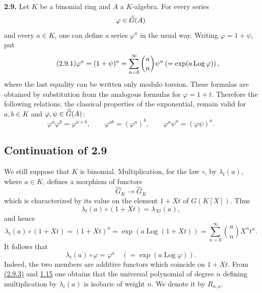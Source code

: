 \textbf{2.9.} Let \(K\) be a binomial ring and \(A\) a \(K\)-algebra. For every series
\[
  \varphi\in\Ghat(A)
\]
and every \(a\in K\), one can define a series \(\varphi^a\) in the usual way. Writing \(\varphi=1+\psi\), put
\begin{equation}\tag{2.9.1}
  \varphi^a=(1+\psi)^a
  =
  \sum_{n=0}^{\infty}\binom{a}{n}\psi^n
  \left(=\exp(a\Log\varphi)\right),
\end{equation}
where the last equality can be written only modulo torsion. These formulas are obtained by substitution from the analogous formulas for \(\varphi=1+t\). Therefore the following relations, the classical properties of the exponential, remain valid for \(a,b\in K\) and \(\varphi,\psi\in\Ghat(A)\):
\begin{equation}\tag{2.9.2}
  \varphi^a\varphi^b=\varphi^{a+b},\qquad
  \varphi^{ab}=(\varphi^a)^b,\qquad
  \varphi^a\psi^a=(\varphi\psi)^a .
\end{equation}



\providecommand{\Ghat}{\widehat G}
\providecommand{\Gg}{\widehat G_g}
\providecommand{\Gcirc}{\widehat G_{\circ}}
\providecommand{\Gnabla}{\widehat G_{\nabla}}
\providecommand{\Grhat}{\widehat{\operatorname{Gr}}}
\providecommand{\Log}{\operatorname{Log}}
\providecommand{\Fil}{\operatorname{Fil}}
\providecommand{\eps}{\varepsilon}
\providecommand{\id}{\operatorname{id}}
\providecommand{\Sym}{\operatorname{Sym}}
\providecommand{\Mon}{\operatorname{Mon}}


\subsection*{Continuation of 2.9}

We still suppose that \(K\) is binomial. Multiplication, for the law \(\circ\), by \(\lambda_t(a)\), where \(a\in K\), defines a morphism of functors
\[
  \Ghat_K\longrightarrow \Ghat_K
\]
which is characterized by its value on the element \(1+Xt\) of \(G(K[X])\). Thus
\[
  \lambda_t(a)\circ(1+Xt)=\lambda_{Xt}(a),
\]
and hence
\begin{equation}\tag{2.9.3}
  \lambda_t(a)\circ(1+Xt)
  =(1+Xt)^a
  =\exp(a\Log(1+Xt))
  =\sum_{n=0}^{\infty}\binom{a}{n}X^nt^n .
\end{equation}
It follows that
\begin{equation}\tag{2.9.4}
  \lambda_t(a)\circ\varphi=\varphi^a
  \quad(=\exp(a\Log\varphi)).
\end{equation}
Indeed, the two members are additive functors which coincide on \(1+Xt\). From \hyperlink{sga6.e05.eq.2-9-3}{(2.9.3)} and \hyperlink{sga6.e05.para.1-15}{1.15} one obtains that the universal polynomial of degree \(n\) defining multiplication by \(\lambda_t(a)\) is isobaric of weight \(n\). We denote it by \(R_{n,a}\).

